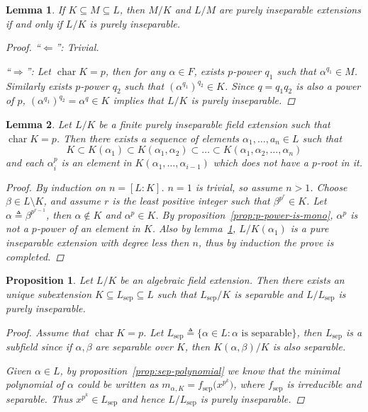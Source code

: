 \documentclass[a4paper]{article}
\newcommand{\defeq}{\triangleq}
\DeclareMathOperator{\Char}{char}
\newtheorem{lemma}{Lemma}
\theoremstyle{remark}
\theoremstyle{definition}
\theoremstyle{definition}
\theoremstyle{plain}
\newtheorem{proposition}{Proposition}
\begin{document}
  \begin{lemma} \label{lemma:stack-of-pure-ext}
    If $K \subseteq M \subseteq L$, then $M/K$ and $L/M$ are purely inseparable extensions
    if and only if $L / K$ is purely inseparable.
    \begin{proof}
      ``$\Leftarrow$'': Trivial.

      ``$\Rightarrow$'':
      Let $\Char K = p$, then for any $\alpha \in F$, exists $p$-power $q_1$ such that
      $\alpha^{q_1} \in M$. Similarly exists $p$-power $q_2$ such that $(\alpha^{q_1})^{q_2} \in K$.
      Since $q = q_1 q_2$ is also a power of $p$, $(\alpha^{q_1})^{q_2} = \alpha^q \in K$
      implies that $L/K$ is purely inseparable.
    \end{proof}
  \end{lemma}

  \begin{lemma} \label{lemma:building-tower}
    Let $L/K$ be a finite purely inseparable field extension such that $\Char K = p$.
    Then there exists a sequence of elements $\alpha_1, \dots, a_n \in L$ such that
    \[ K \subset K(\alpha_1) \subset K(\alpha_1, \alpha_2) \subset \dots \subset K(\alpha_1, \alpha_2, \dots, \alpha_n) \]
    and each $\alpha_i^p$ is an element in $K(\alpha_1, \dots, \alpha_{i-1})$ which
    does not have a $p$-root in it.

    \begin{proof}
      By induction on $n = [L: K]$. $n = 1$ is trivial, so assume $n > 1$.
      Choose $\beta \in L \setminus K$, and assume $r$ is the least positive integer
      such that $\beta^{p^r} \in K$. Let $\alpha \defeq \beta^{p^{r-1}}$, then $\alpha \not\in K$
      and $\alpha^p \in K$. By proposition~\ref{prop:p-power-is-mono}, $\alpha^p$ is not a $p$-power
      of an element in $K$. Also by lemma~\ref{lemma:stack-of-pure-ext}, $L / K(\alpha_1)$
      is a pure inseparable extension with degree less then $n$, thus by induction the prove is completed.
    \end{proof}
  \end{lemma}


  \begin{proposition} \label{prop:decomp-of-insep}
    Let $L/K$ be an algebraic field extension. Then there exists an unique
    subextension $K \subseteq L_{\text{sep}} \subseteq L$ such that $L_{\text{sep}}/K$
    is separable and $L/L_{\text{sep}}$ is purely inseparable.

    \begin{proof}
      Assume that $\Char K = p$. Let $L_{\text{sep}} \defeq \{ \alpha \in L : \alpha \text{ is separable}\}$,
      then $L_{\text{sep}}$ is a subfield since if $\alpha, \beta$ are separable over $K$, then $K(\alpha, \beta)/K$
      is also separable.

      Given $\alpha \in L$, by proposition~\ref{prop:sep-polynomial} we know that the minimal
      polynomial of $\alpha$ could be written as $m_{\alpha, K} = f_\text{sep}\big(x^{p^k}\big)$,
      where $f_\text{sep}$ is irreducible and separable. Thus $x^{p^k} \in L_\text{sep}$ and
      hence $L/L_\text{sep}$ is purely inseparable.
    \end{proof}
  \end{proposition}
\end{document}
